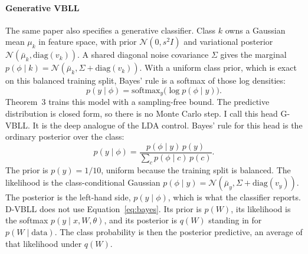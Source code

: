 \documentclass[11pt,a4paper]{article}
\begin{document}
\paragraph{Generative VBLL}
The same paper also specifies a generative classifier.
Class $k$ owns a Gaussian mean $\mu_k$ in feature space, with prior $\mathcal{N}(0, s^{2}I)$ and variational posterior $\mathcal{N}(\bar\mu_k,\mathrm{diag}(v_k))$.
A shared diagonal noise covariance $\Sigma$ gives the marginal
$p(\phi\mid k)=\mathcal{N}(\bar\mu_k,\Sigma+\mathrm{diag}(v_k))$.
With a uniform class prior, which is exact on this balanced training split, Bayes' rule is a softmax of those log densities:
\begin{equation}
p(y\mid\phi)=\mathrm{softmax}_y\big(\log p(\phi\mid y)\big).
\label{eq:gvbll}
\end{equation}
Theorem~3 trains this model with a sampling-free bound. The predictive distribution is closed form, so there is no Monte Carlo step.
I call this head G-VBLL. It is the deep analogue of the LDA control.
Bayes' rule for this head is the ordinary posterior over the class:
\begin{equation}
p(y\mid\phi)
= \frac{p(\phi\mid y)\,p(y)}{\sum_{c} p(\phi\mid c)\,p(c)}.
\label{eq:bayes}
\end{equation}
The prior is $p(y)=1/10$, uniform because the training split is balanced.
The likelihood is the class-conditional Gaussian $p(\phi\mid y)=\mathcal{N}(\bar\mu_y,\Sigma+\mathrm{diag}(v_y))$.
The posterior is the left-hand side, $p(y\mid\phi)$, which is what the classifier reports.
D-VBLL does not use Equation~\eqref{eq:bayes}.
Its prior is $p(W)$, its likelihood is the softmax $p(y\mid x,W,\theta)$, and its posterior is $q(W)$ standing in for $p(W\mid\mathrm{data})$.
The class probability is then the posterior predictive, an average of that likelihood under $q(W)$.
\end{document}
